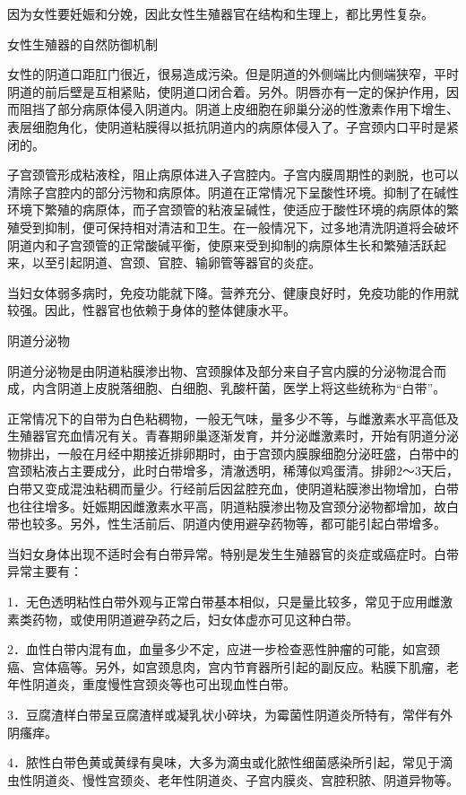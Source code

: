 \documentclass[12pt,UTF8,openany]{ctexbook}
\begin{document}
因为女性要妊娠和分娩，因此女性生殖器官在结构和生理上，都比男性复杂。

女性生殖器的自然防御机制

女性的阴道口距肛门很近，很易造成污染。但是阴道的外侧端比内侧端狭窄，平时阴道的前后壁是互相紧贴，使阴道口闭合着。另外。阴唇亦有一定的保护作用，因而阻挡了部分病原体侵入阴道内。阴道上皮细胞在卵巢分泌的性激素作用下增生、表层细胞角化，使阴道粘膜得以抵抗阴道内的病原体侵入了。子宫颈内口平时是紧闭的。

子宫颈管形成粘液栓，阻止病原体进入子宫腔内。子宫内膜周期性的剥脱，也可以清除子宫腔内的部分污物和病原体。阴道在正常情况下呈酸性环境。抑制了在碱性环境下繁殖的病原体，而子宫颈管的粘液呈碱性，使适应于酸性环境的病原体的繁殖受到抑制，便可保持相对清洁和卫生。在一般情况下，过多地清洗阴道将会破坏阴道内和子宫颈管的正常酸碱平衡，使原来受到抑制的病原体生长和繁殖活跃起来，以至引起阴道、宫颈、官腔、输卵管等器官的炎症。

当妇女体弱多病时，免疫功能就下降。营养充分、健康良好时，免疫功能的作用就较强。因此，性器官也依赖于身体的整体健康水平。

阴道分泌物

阴道分泌物是由阴道粘膜渗出物、宫颈腺体及部分来自子宫内膜的分泌物混合而成，内含阴道上皮脱落细胞、白细胞、乳酸杆菌，医学上将这些统称为“白带”。

正常情况下的自带为白色粘稠物，一般无气味，量多少不等，与雌激素水平高低及生殖器官充血情况有关。青春期卵巢逐渐发育，并分泌雌激素时，开始有阴道分泌物排出，一般在月经中期接近排卵期时，由于宫颈内膜腺细胞分泌旺盛，白带中的宫颈粘液占主要成分，此时白带增多，清澈透明，稀薄似鸡蛋清。排卵2～3天后，白带又变成混浊粘稠而量少。行经前后因盆腔充血，使阴道粘膜渗出物增加，白带也往往增多。妊娠期因雌激素水平高，阴道粘膜渗出物及宫颈分泌物都增加，故白带也较多。另外，性生活前后、阴道内使用避孕药物等，都可能引起白带增多。

当妇女身体出现不适时会有白带异常。特别是发生生殖器官的炎症或癌症时。白带异常主要有：

1．无色透明粘性白带外观与正常白带基本相似，只是量比较多，常见于应用雌激素类药物，或使用阴道避孕药之后，妇女体虚亦可见这种白带。

2．血性白带内混有血，血量多少不定，应进一步检查恶性肿瘤的可能，如宫颈癌、宫体癌等。另外，如宫颈息肉，宫内节育器所引起的副反应。粘膜下肌瘤，老年性阴道炎，重度慢性宫颈炎等也可出现血性白带。

3．豆腐渣样白带呈豆腐渣样或凝乳状小碎块，为霉菌性阴道炎所特有，常伴有外阴瘙痒。

4．脓性白带色黄或黄绿有臭味，大多为滴虫或化脓性细菌感染所引起，常见于滴虫性阴道炎、慢性宫颈炎、老年性阴道炎、子宫内膜炎、宫腔积脓、阴道异物等。
\end{document}
